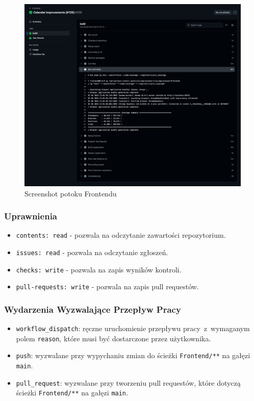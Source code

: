 \begin{figure}[H]
    \centering
    \includegraphics[width=1\textwidth]{attachments/frontend-ci}
    \caption{Screenshot potoku Frontendu}
\end{figure}

\subsubsection{Uprawnienia}
\begin{itemize}
    \item \texttt{\textcolor{codeblue}{contents: read}} - pozwala na odczytanie zawartości repozytorium.
    \item \texttt{\textcolor{codeblue}{issues: read}} - pozwala na odczytanie zgłoszeń.
    \item \texttt{\textcolor{codeblue}{checks: write}} - pozwala na zapis wyników kontroli.
    \item \texttt{\textcolor{codeblue}{pull-requests: write}} - pozwala na zapis pull requestów.
\end{itemize}

\subsubsection{Wydarzenia Wyzwalające Przepływ Pracy}
\begin{itemize}
    \item \texttt{\textcolor{codeblue}{workflow\_dispatch}}: ręczne uruchomienie przepływu pracy~z~wymaganym polem \texttt{\textcolor{codeblue}{reason}}, które musi być dostarczone przez użytkownika.
    \item \texttt{\textcolor{codeblue}{push}}: wyzwalane przy wypychaniu zmian do ścieżki \texttt{\textcolor{codeblue}{Frontend/**}} na gałęzi \texttt{\textcolor{codeblue}{main}}.
    \item \texttt{\textcolor{codeblue}{pull\_request}}: wyzwalane przy tworzeniu pull requestów, które dotyczą ścieżki \texttt{\textcolor{codeblue}{Frontend/**}} na gałęzi \texttt{\textcolor{codeblue}{main}}.
\end{itemize}

